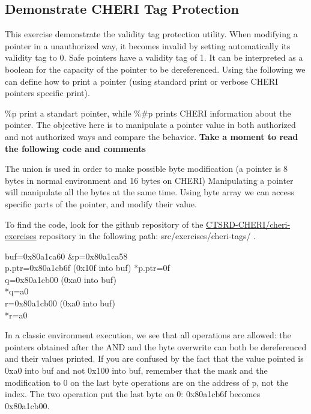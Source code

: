 \documentclass[a4paper, 11pt]{article}
\begin{document}
\subsection{Demonstrate CHERI Tag Protection}
	This exercise demonstrate the validity tag protection utility.
	When modifying a pointer in a unauthorized way, it becomes invalid by setting automatically its validity tag to 0. Safe pointers have a validity tag of 1.
	It can be interpreted as a boolean for the capacity of the pointer to be dereferenced.
	Using the following we can define how to print a pointer (using standard print or verbose CHERI pointers specific print).
	
	\%p print a standart pointer, while \%\#p prints CHERI information about the pointer.
	The objective here is to manipulate a pointer value in both authorized and not authorized ways and compare the behavior.
	\textbf{Take a moment to read the following code and comments}
	
	The union is used in order to make possible byte modification (a pointer is 8 bytes in normal environment and 16 bytes on CHERI)
	Manipulating a pointer will manipulate all the bytes at the same time. Using byte array we can access specific parts of the pointer, and modify their value.
	

To find the code, look for the github repository of the \href{https://github.com/CTSRD-CHERI/cheri-exercises}{CTSRD-CHERI/cheri-exercises} repository in the following path: src/exercises/cheri-tags/ . 


\begin{tcolorbox}[colback=gray!5!white, colframe=gray!75!black, title=Output on a classic \Gls{risc-v} environment (no CHERI Protection)]
buf=0x80a1ca60 \&p=0x80a1ca58\\
p.ptr=0x80a1cb6f (0x10f into buf) *p.ptr=0f\\
q=0x80a1cb00 (0xa0 into buf)\\
*q=a0\\
r=0x80a1cb00 (0xa0 into buf)\\
*r=a0
\end{tcolorbox}
In a classic environment execution, we see that all operations are allowed: the pointers obtained after the AND and the byte overwrite can both be dereferenced and their values printed.
If you are confused by the fact that the value pointed is 0xa0 into buf and not 0x100 into buf, remember that the mask and the modification to 0 on the last byte operations are on the address of p, not the index.
The two operation put the last byte on 0: 0x80a1cb6f  becomes 0x80a1cb00.
\end{document}
